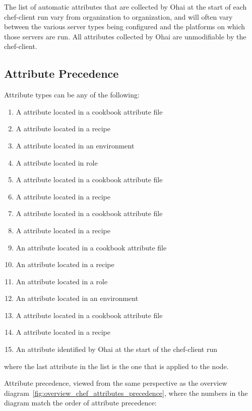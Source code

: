 The list of automatic attributes that are collected by Ohai at the start of each chef-client run vary from organization to organization, and will often vary between the various server types being configured and the platforms on which those servers are run. All attributes collected by Ohai are unmodifiable by the chef-client.

\subsection{Attribute Precedence}

Attribute types can be any of the following:

\begin{enumerate}
  \item A  attribute located in a cookbook attribute file
  \item A  attribute located in a recipe
  \item A  attribute located in an environment
  \item A  attribute located in role
  \item A  attribute located in a cookbook attribute file
  \item A  attribute located in a recipe
  \item A  attribute located in a cookbook attribute file
  \item A  attribute located in a recipe
  \item An  attribute located in a cookbook attribute file
  \item An  attribute located in a recipe
  \item An  attribute located in a role
  \item An  attribute located in an environment
  \item A  attribute located in a cookbook attribute file
  \item A  attribute located in a recipe
  \item An  attribute identified by Ohai at the start of the chef-client run
\end{enumerate}

where the last attribute in the list is the one that is applied to the node.

Attribute precedence, viewed from the same perspective as the overview diagram~\ref{fig:overview_chef_attributes_precedence}, where the numbers in the diagram match the order of attribute precedence:

